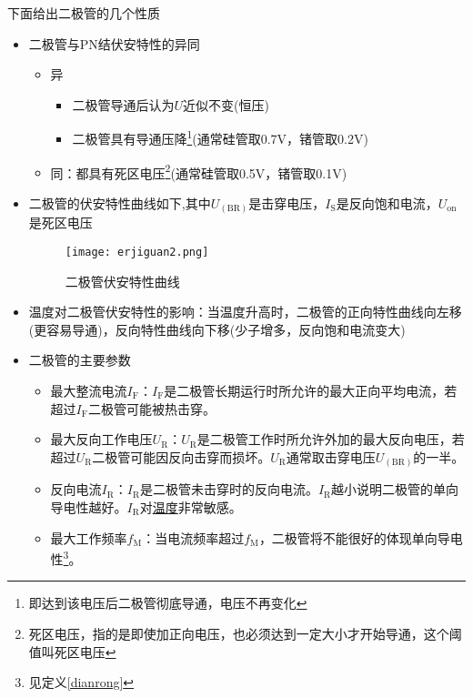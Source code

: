 \documentclass[cn,pad,11pt,geye]{elegantnote}
\begin{document}
\begin{proposition}[二极管的伏安特性]下面给出二极管的几个性质
	\begin{itemize}
		\item 二极管与PN结伏安特性的异同
		\begin{itemize}
			\item 异
			\begin{itemize}
				\item 二极管导通后认为$U$近似不变(恒压)
				\item 二极管具有导通压降\footnote{即达到该电压后二极管彻底导通，电压不再变化}(通常硅管取0.7V，锗管取0.2V)
			\end{itemize}
			\item 同：都具有死区电压\footnote{死区电压，指的是即使加正向电压，也必须达到一定大小才开始导通，这个阈值叫死区电压}(通常硅管取0.5V，锗管取0.1V)
		\end{itemize}
		\item 二极管的伏安特性曲线如下,其中$U_{\mathrm{(BR)}}$是击穿电压，$I_{\mathrm{S}}$是反向饱和电流，$U_{\mathrm{on}}$是死区电压
		\begin{figure}[h]
			\centering
			\texttt{[image: erjiguan2.png]}
			\caption{二极管伏安特性曲线}
		\end{figure}
		\item 温度对二极管伏安特性的影响：当温度升高时，二极管的正向特性曲线向左移(更容易导通)，反向特性曲线向下移(少子增多，反向饱和电流变大)\label{wendu}
		\item 二极管的主要参数
		\begin{itemize}
			\item 最大整流电流$I_{\mathrm{F}}$：$I_{\mathrm{F}}$是二极管长期运行时所允许的最大正向平均电流，若超过$I_{\mathrm{F}}$二极管可能被热击穿。
			\item 最大反向工作电压$U_{\mathrm{R}}$：$U_{\mathrm{R}}$是二极管工作时所允许外加的最大反向电压，若超过$U_{\mathrm{R}}$二极管可能因反向击穿而损坏。$U_{\mathrm{R}}$通常取击穿电压$U_{\mathrm{(BR)}}$的一半。
			\item 反向电流$I_{\mathrm{R}}$：$I_{\mathrm{R}}$是二极管未击穿时的反向电流。$I_{\mathrm{R}}$越小说明二极管的单向导电性越好。$I_{\mathrm{R}}$对\hyperref[wendu]{温度}非常敏感。
			\item 最大工作频率$f_{\mathrm{M}}$：当电流频率超过$f_{\mathrm{M}}$，二极管将不能很好的体现单向导电性\footnote{见定义\ref{dianrong}}。
		\end{itemize}
	\end{itemize}
\end{proposition}
\end{document}
